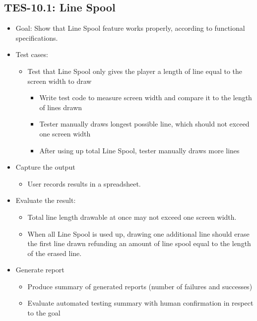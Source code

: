 \subsection{TES-10.1: Line Spool }
\begin{itemize}
\item Goal: Show that Line Spool feature works properly, according to functional specifications.

\item Test cases: 
\begin{itemize}
\item Test that Line Spool only gives the player a length of line equal to the screen width to draw
\begin{itemize}
\item Write test code to measure screen width and compare it to the length of lines drawn
\item Tester manually draws longest possible line, which should not exceed one screen width
\item After using up total Line Spool, tester manually draws more lines
\end{itemize}
\end{itemize}

\item Capture the output 
\begin{itemize}
\item User records results in a spreadsheet.
\end{itemize}

\item Evaluate the result: 
\begin{itemize}
\item Total line length drawable at once may not exceed one screen width.
\item When all Line Spool is used up, drawing one additional line should erase the first line drawn
refunding an amount of line spool equal to the length of the erased line. 
\end{itemize}

\item Generate report 
\begin{itemize}
\item Produce summary of generated reports (number of failures and successes)
\item Evaluate automated testing summary with human confirmation in respect to the goal
\end{itemize}
\end{itemize}

